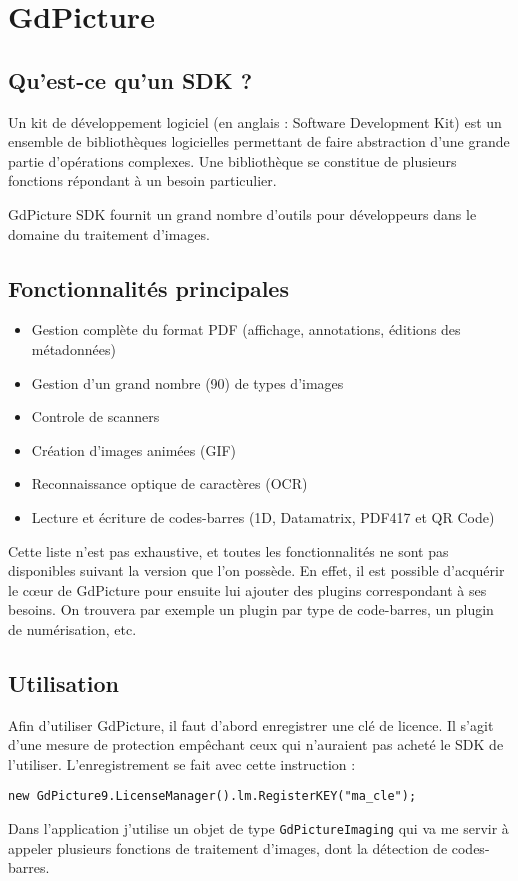 \chapter{GdPicture}
\label{gdpicture}

\section{Qu'est-ce qu'un SDK ?}

Un kit de développement logiciel (en anglais : Software Development Kit) est un ensemble de bibliothèques logicielles permettant de faire abstraction d'une grande partie d'opérations complexes. Une bibliothèque se constitue de plusieurs fonctions répondant à un besoin particulier.

GdPicture SDK fournit un grand nombre d'outils pour développeurs dans le domaine du traitement d'images.

\section{Fonctionnalités principales}

\begin{itemize}
\item Gestion complète du format PDF (affichage, annotations, éditions des métadonnées)
\item Gestion d'un grand nombre (90) de types d'images
\item Controle de scanners
\item Création d'images animées (GIF)
\item Reconnaissance optique de caractères (OCR)
\item Lecture et écriture de codes-barres (1D, Datamatrix, PDF417 et QR Code)
\end{itemize}

Cette liste n'est pas exhaustive, et toutes les fonctionnalités ne sont pas disponibles suivant la version que l'on possède. En effet, il est possible d'acquérir le c\oe ur de GdPicture pour ensuite lui ajouter des plugins correspondant à ses besoins. On trouvera  par exemple un plugin par type de code-barres, un plugin de numérisation, etc.

\section{Utilisation}

Afin d'utiliser GdPicture, il faut d'abord enregistrer une clé de licence. Il s'agit d'une mesure de protection empêchant ceux qui n'auraient pas acheté le SDK de l'utiliser. L'enregistrement se fait avec cette instruction :

\verb|new GdPicture9.LicenseManager().lm.RegisterKEY("ma_cle");|

Dans l'application j'utilise un objet de type \verb|GdPictureImaging| qui va me servir à appeler plusieurs fonctions de traitement d'images, dont la détection de codes-barres.